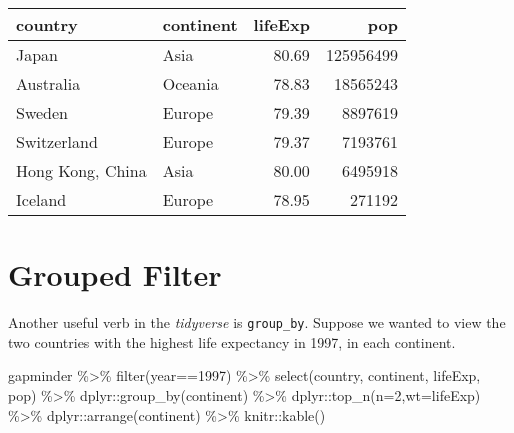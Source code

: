 \documentclass[
]{book}
\newenvironment{Shaded}{\begin{snugshade}}{\end{snugshade}}
\newcommand{\AttributeTok}[1]{\textcolor[rgb]{0.77,0.63,0.00}{#1}}
\newcommand{\DecValTok}[1]{\textcolor[rgb]{0.00,0.00,0.81}{#1}}
\newcommand{\FunctionTok}[1]{\textcolor[rgb]{0.00,0.00,0.00}{#1}}
\newcommand{\NormalTok}[1]{#1}
\newcommand{\SpecialCharTok}[1]{\textcolor[rgb]{0.00,0.00,0.00}{#1}}
\begin{document}
\begin{tabular}{l|l|r|r}
\hline
country & continent & lifeExp & pop\\
\hline
Japan & Asia & 80.69 & 125956499\\
\hline
Australia & Oceania & 78.83 & 18565243\\
\hline
Sweden & Europe & 79.39 & 8897619\\
\hline
Switzerland & Europe & 79.37 & 7193761\\
\hline
Hong Kong, China & Asia & 80.00 & 6495918\\
\hline
Iceland & Europe & 78.95 & 271192\\
\hline
\end{tabular}

\hypertarget{grouped-filter}{%
\section{Grouped Filter}\label{grouped-filter}}

Another useful verb in the \emph{tidyverse} is \texttt{group\_by}. Suppose we wanted to view the two countries with the highest life expectancy in 1997, in each continent.

\begin{Shaded}
\begin{Highlighting}[]
\NormalTok{gapminder }\SpecialCharTok{\%\textgreater{}\%} 
  \FunctionTok{filter}\NormalTok{(year}\SpecialCharTok{==}\DecValTok{1997}\NormalTok{) }\SpecialCharTok{\%\textgreater{}\%}  
  \FunctionTok{select}\NormalTok{(country, continent, lifeExp, pop) }\SpecialCharTok{\%\textgreater{}\%}
\NormalTok{  dplyr}\SpecialCharTok{::}\FunctionTok{group\_by}\NormalTok{(continent) }\SpecialCharTok{\%\textgreater{}\%}
\NormalTok{  dplyr}\SpecialCharTok{::}\FunctionTok{top\_n}\NormalTok{(}\AttributeTok{n=}\DecValTok{2}\NormalTok{,}\AttributeTok{wt=}\NormalTok{lifeExp) }\SpecialCharTok{\%\textgreater{}\%}
\NormalTok{  dplyr}\SpecialCharTok{::}\FunctionTok{arrange}\NormalTok{(continent) }\SpecialCharTok{\%\textgreater{}\%}
\NormalTok{  knitr}\SpecialCharTok{::}\FunctionTok{kable}\NormalTok{()}
\end{Highlighting}
\end{Shaded}
\end{document}
